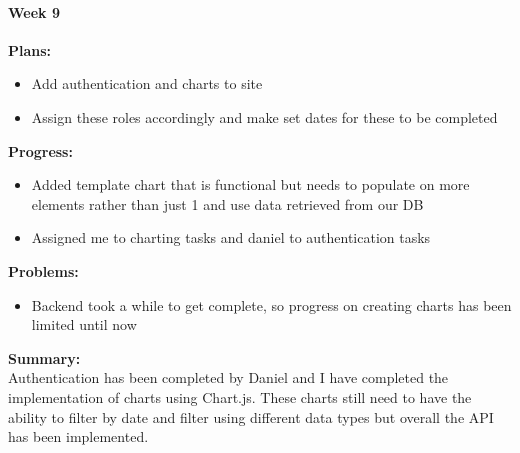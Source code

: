 \paragraph{Week 9}
\begin{adjustwidth}{2.5em}{0pt}
    \vspace{-0.5cm}\textbf{Plans:}
    \vspace{-0.5cm}
    \begin{itemize}
        \item Add authentication and charts to site
        \item Assign these roles accordingly and make set dates for these to be completed
    \end{itemize} 
    \vspace{-0.3cm}\textbf{Progress:}
    \vspace{-0.5cm}
    \begin{itemize}
        \item Added template chart that is functional but needs to populate on more elements rather than just 1 and use data retrieved from our DB
        \item Assigned me to charting tasks and daniel to authentication tasks
    \end{itemize} 
    \vspace{-0.3cm}\textbf{Problems:}
    \vspace{-0.5cm}
    \begin{itemize}
        \item Backend took a while to get complete, so progress on creating charts has been limited until now
    \end{itemize}  
    \vspace{-0.3cm}\noindent\textbf{Summary:}\\
    \noindent Authentication has been completed by Daniel and I have completed the implementation of charts using Chart.js. These charts still need to have the ability to filter by date and filter using different data types but overall the API has been implemented.
\end{adjustwidth} 
